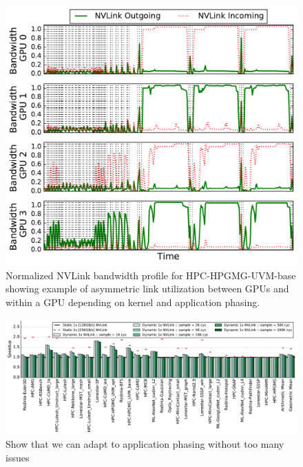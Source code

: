 \begin{figure}[t]
    \centering
    \includegraphics[width=1.0\columnwidth]{figures/bw_profile_HPGMG_UVM_base.pdf}
    \caption{Normalized NVLink bandwidth profile for HPC-HPGMG-UVM-base showing example of asymmetric 
    link utilization between GPUs and within a GPU depending on kernel and application phasing.}
    \label{fig:link-motivation}
\end{figure}

\begin{figure}[tp]
    \centering
    \includegraphics[width=1.0\textwidth]{figures/plot_nvlink_sample_time.pdf}
    \caption{Show that we can adapt to application phasing without too many 
issues}
    \label{fig:sampletime}
\end{figure}


